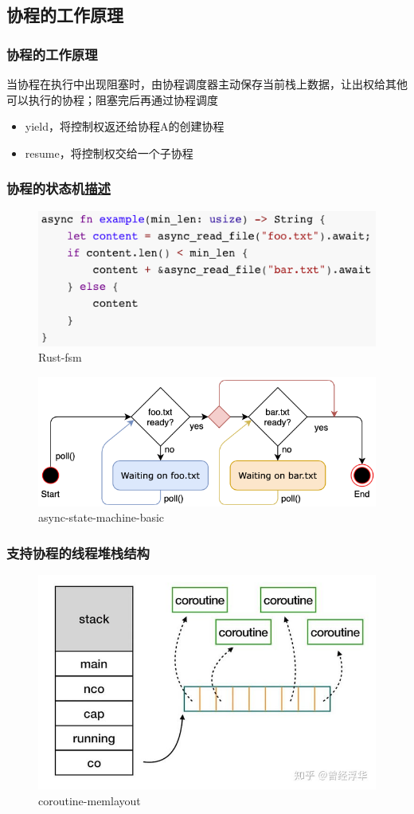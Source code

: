 \subsection{协程的工作原理}
% 
\begin{frame}[fragile]
    \frametitle{协程的工作原理}
% 
当协程在执行中出现阻塞时，由协程调度器主动保存当前栈上数据，让出权给其他可以执行的协程；阻塞完后再通过协程调度%

    \begin{itemize}
        \item yield，将控制权返还给协程A的创建协程
        \item resume，将控制权交给一个子协程
    \end{itemize}

% 

\end{frame}
\begin{frame}[fragile]
    \frametitle{协程的状态机\href{https://os.phil-opp.com/async-await/#the-async-await-pattern}{描述}}
% 
	\begin{figure}
		\centering
		\includegraphics[width=0.2\linewidth]{figs/Rust-fsm.png}
		\caption{Rust-fsm}
	\end{figure}


% 
	\begin{figure}
		\centering
		\includegraphics[width=0.2\linewidth]{figs/async-state-machine-basic.png}
    \caption{async-state-machine-basic}
  \end{figure}


% 
% 
% 

\end{frame}
\begin{frame}[fragile]
    \frametitle{支持协程的线程堆栈结构}
% 
	\begin{figure}
		\centering
		\includegraphics[width=0.5\linewidth]{figs/coroutine-memlayout.jpg}
    \caption{coroutine-memlayout}
  \end{figure}



% 

\end{frame}
